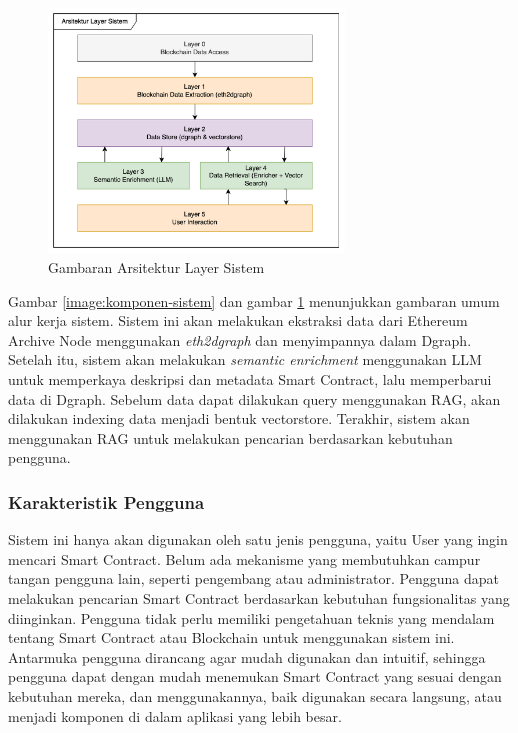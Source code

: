 \begin{figure}[ht]
	\centering
	\includegraphics[width=0.7\textwidth]{resources/chapter-3/layer-arsitektur-new.png}
	\caption{Gambaran Arsitektur Layer Sistem}
	\label{image:layer-arsitektur}
\end{figure}


Gambar \ref{image:komponen-sistem} dan gambar \ref{image:layer-arsitektur} menunjukkan gambaran umum alur kerja sistem. Sistem ini akan melakukan ekstraksi data dari Ethereum Archive Node menggunakan \textit{eth2dgraph} dan menyimpannya dalam Dgraph. Setelah itu, sistem akan melakukan \textit{semantic enrichment} menggunakan LLM untuk memperkaya deskripsi dan metadata Smart Contract, lalu memperbarui data di Dgraph. Sebelum data dapat dilakukan query menggunakan RAG, akan dilakukan indexing data menjadi bentuk vectorstore. Terakhir, sistem akan menggunakan RAG untuk melakukan pencarian berdasarkan kebutuhan pengguna. 



\subsubsection{Karakteristik Pengguna}

Sistem ini hanya akan digunakan oleh satu jenis pengguna, yaitu User yang ingin mencari Smart Contract. Belum ada mekanisme yang membutuhkan campur tangan pengguna lain, seperti pengembang atau administrator. Pengguna dapat melakukan pencarian Smart Contract berdasarkan kebutuhan fungsionalitas yang diinginkan. Pengguna tidak perlu memiliki pengetahuan teknis yang mendalam tentang Smart Contract atau Blockchain untuk menggunakan sistem ini. Antarmuka pengguna dirancang agar mudah digunakan dan intuitif, sehingga pengguna dapat dengan mudah menemukan Smart Contract yang sesuai dengan kebutuhan mereka, dan menggunakannya, baik digunakan secara langsung, atau menjadi komponen di dalam aplikasi yang lebih besar.

